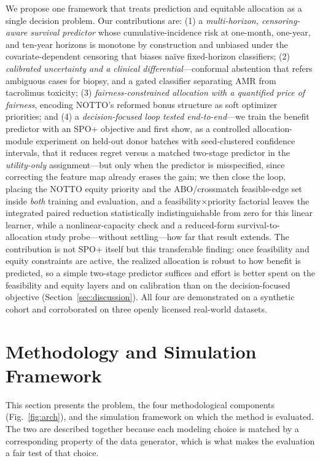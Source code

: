 \documentclass[journal]{IEEEtran}
\begin{document}
We propose one framework that treats prediction and equitable allocation as a single decision problem. Our contributions are: (1) a \emph{multi-horizon, censoring-aware survival predictor} whose cumulative-incidence risk at one-month, one-year, and ten-year horizons is monotone by construction and unbiased under the covariate-dependent censoring that biases na\"ive fixed-horizon classifiers; (2) \emph{calibrated uncertainty and a clinical differential}---conformal abstention that refers ambiguous cases for biopsy, and a gated classifier separating AMR from tacrolimus toxicity; (3) \emph{fairness-constrained allocation with a quantified price of fairness}, encoding NOTTO's reformed bonus structure as soft optimizer priorities; and (4) a \emph{decision-focused loop tested end-to-end}---we train the benefit predictor with an SPO+ objective and first show, as a controlled allocation-module experiment on held-out donor batches with seed-clustered confidence intervals, that it reduces regret versus a matched two-stage predictor in the \emph{utility-only} assignment---but only when the predictor is misspecified, since correcting the feature map already erases the gain; we then close the loop, placing the NOTTO equity priority and the ABO/crossmatch feasible-edge set inside \emph{both} training and evaluation, and a feasibility$\times$priority factorial leaves the integrated paired reduction statistically indistinguishable from zero for this linear learner, while a nonlinear-capacity check and a reduced-form survival-to-allocation study probe---without settling---how far that result extends. The contribution is not SPO+ itself but this transferable finding: once feasibility and equity constraints are active, the realized allocation is robust to how benefit is predicted, so a simple two-stage predictor suffices and effort is better spent on the feasibility and equity layers and on calibration than on the decision-focused objective (Section~\ref{sec:discussion}). All four are demonstrated on a synthetic cohort and corroborated on three openly licensed real-world datasets.

\section{Methodology and Simulation Framework}
This section presents the problem, the four methodological components (Fig.~\ref{fig:arch}), and the simulation framework on which the method is evaluated. The two are described together because each modeling choice is matched by a corresponding property of the data generator, which is what makes the evaluation a fair test of that choice.
\end{document}
